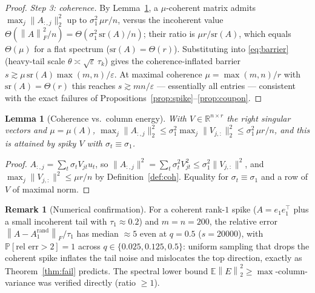 \documentclass{amsart}
\newtheorem{lemma}{Lemma}
\theoremstyle{definition}
\newtheorem{remark}{Remark}
\newcommand{\R}{\mathbb{R}}
\newcommand{\Frob}[1]{\left\lVert #1\right\rVert_F}
\newcommand{\Op}[1]{\left\lVert #1\right\rVert_2}
\newcommand{\E}{\mathbb{E}}
\newcommand{\Prob}{\mathbb{P}}
\begin{document}
\begin{proof}
\emph{Step 3: coherence.} By Lemma~\ref{lem:colenergy}, a $\mu$-coherent matrix
admits $\max_j\|A_{:,j}\|_2^2$ up to $\sigma_1^2\,\mu r/n$, versus the incoherent
value $\Theta(\Frob A^2/n)=\Theta(\sigma_1^2\,\mathrm{sr}(A)/n)$; their ratio is
$\mu r/\mathrm{sr}(A)$, which equals $\Theta(\mu)$ for a flat spectrum
($\mathrm{sr}(A)=\Theta(r)$). Substituting into \eqref{eq:barrier} (heavy-tail
scale $\theta\asymp\sqrt\varepsilon\,\tau_k$) gives the coherence-inflated
barrier $s\gtrsim\mu\,\mathrm{sr}(A)\max(m,n)/\varepsilon$. At maximal coherence
$\mu=\max(m,n)/r$ with $\mathrm{sr}(A)=\Theta(r)$ this reaches
$s\gtrsim mn/\varepsilon$ --- essentially all entries --- consistent with the
exact failures of Propositions~\ref{prop:spike}--\ref{prop:coupon}.
\end{proof}

\begin{lemma}[Coherence vs.\ column energy]\label{lem:colenergy}
With $V\in\R^{n\times r}$ the right singular vectors and $\mu=\mu(A)$,
$\max_j\|A_{:,j}\|_2^2\le\sigma_1^2\max_j\|V_{j,:}\|_2^2\le\sigma_1^2\,\mu r/n$,
and this is attained by spiky $V$ with $\sigma_t\equiv\sigma_1$.
\end{lemma}

\begin{proof}
$A_{:,j}=\sum_t\sigma_t V_{jt}u_t$, so $\|A_{:,j}\|^2=\sum_t\sigma_t^2V_{jt}^2
\le\sigma_1^2\|V_{j,:}\|^2$, and $\max_j\|V_{j,:}\|^2\le\mu r/n$ by
Definition~\ref{def:coh}. Equality for $\sigma_t\equiv\sigma_1$ and a row of $V$
of maximal norm.
\end{proof}

\begin{remark}[Numerical confirmation]\label{rem:numfail}
For a coherent rank-$1$ spike ($A=e_1e_1^\top$ plus a small incoherent tail with
$\tau_1\approx0.2$) and $m=n=200$, the relative error
$\Frob{A-A_1^{\mathrm{rand}}}/\tau_1$ has median $\approx5$ even at $q=0.5$
($s=20000$), with $\Prob[\text{rel err}>2]=1$ across $q\in\{0.025,0.125,0.5\}$:
uniform sampling that drops the coherent spike inflates the tail noise and
mislocates the top direction, exactly as Theorem~\ref{thm:fail} predicts. The
spectral lower bound $\E\Op E^2\ge\max$-column-variance was verified directly
(ratio $\ge1$).
\end{remark}
\end{document}
